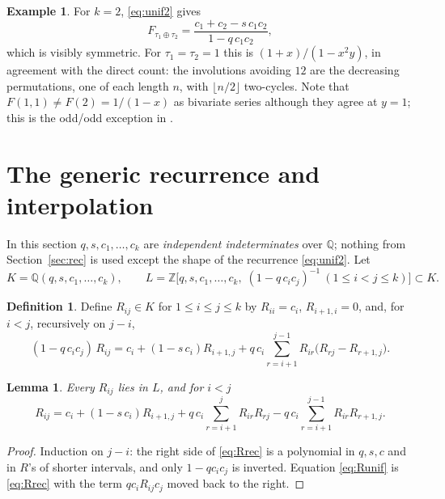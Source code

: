 \documentclass[11pt]{amsart}
\newtheorem{lemma}[theorem]{Lemma}
\theoremstyle{definition}
\newtheorem{definition}[theorem]{Definition}
\newtheorem{example}[theorem]{Example}
\newcommand{\Z}{\mathbb{Z}}
\newcommand{\Q}{\mathbb{Q}}
\newcommand{\ds}{\oplus}
\begin{document}
\begin{example}\label{ex:two}
For $k=2$, \eqref{eq:unif2} gives
\begin{equation}\label{eq:two}
F_{\tau_1\ds\tau_2}=\frac{c_1+c_2-s\,c_1c_2}{1-q\,c_1c_2},
\end{equation}
which is visibly symmetric. For $\tau_1=\tau_2=1$ this is $(1+x)/(1-x^2y)$, in agreement with the direct count: the involutions avoiding $12$ are the decreasing permutations, one of each length $n$, with $\lfloor n/2\rfloor$ two-cycles. Note that $F(1,1)\ne F(2)=1/(1-x)$ as bivariate series although they agree at $y=1$; this is the odd/odd exception in \cite[Theorems 3.12--3.13]{EggeMansour2006}.
\end{example}

\section{The generic recurrence and interpolation}\label{sec:generic}

In this section $q,s,c_1,\dots,c_k$ are \emph{independent indeterminates} over $\Q$; nothing from Section~\ref{sec:rec} is used except the shape of the recurrence \eqref{eq:unif2}. Let
\[
K=\Q(q,s,c_1,\dots,c_k),\qquad
L=\Z\bigl[q,s,c_1,\dots,c_k,\;(1-q\,c_ic_j)^{-1}\ (1\le i<j\le k)\bigr]\subset K.
\]

\begin{definition}\label{def:R}
Define $R_{ij}\in K$ for $1\le i\le j\le k$ by $R_{ii}=c_i$, $R_{i+1,i}=0$, and, for $i<j$, recursively on $j-i$,
\begin{equation}\label{eq:Rrec}
(1-q\,c_ic_j)\,R_{ij}=c_i+(1-s\,c_i)R_{i+1,j}+q\,c_i\sum_{r=i+1}^{j-1}R_{ir}\bigl(R_{rj}-R_{r+1,j}\bigr).
\end{equation}
\end{definition}

\begin{lemma}\label{lem:inL}
Every $R_{ij}$ lies in $L$, and for $i<j$
\begin{equation}\label{eq:Runif}
R_{ij}=c_i+(1-s\,c_i)R_{i+1,j}+q\,c_i\sum_{r=i+1}^{j}R_{ir}R_{rj}-q\,c_i\sum_{r=i+1}^{j-1}R_{ir}R_{r+1,j}.
\end{equation}
\end{lemma}
\begin{proof}
Induction on $j-i$: the right side of \eqref{eq:Rrec} is a polynomial in $q,s,c$ and in $R$'s of shorter intervals, and only $1-qc_ic_j$ is inverted. Equation \eqref{eq:Runif} is \eqref{eq:Rrec} with the term $qc_iR_{ij}c_j$ moved back to the right.
\end{proof}
\end{document}

